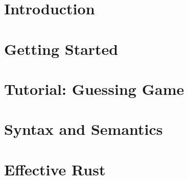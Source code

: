 \documentclass[fontsize=11pt,oneside]{scrbook}
\begin{document}
    \newcommand{\x}{\code{x}}
    \newcommand{\y}{\code{y}}
    \newcommand{\z}{\code{z}}
    \newcommand{\struct}{\code{struct}}
    \newcommand{\mut}{\code{mut}}
    \newcommand{\varchar}{\code{char}}
    \newcommand{\println}{\code{println!}}
    \newcommand{\panic}{\code{panic!}}
    \newcommand{\keylet}{\code{let}}
    \newcommand{\enum}{\code{enum}}
    \newcommand{\String}{\code{String}}
    \newcommand{\match}{\code{match}}
    \newcommand{\keyref}{\code{ref}}
    \newcommand{\itt}{\code{i32}}
    \newcommand{\keyif}{\code{if}}
    \newcommand{\result}{\code{Result}}
    \newcommand{\option}{\code{Option}}
    \newcommand{\none}{\code{None}}
    
    \clearscrheadfoot
    \ohead{\rightmark}
    \pagestyle{scrheadings}
    
    
    \pagebreak
    
    \tableofcontents
    \pagebreak

    \blankpage
    \chapter{Introduction}
    \label{sec:intro}
    
    
    \blankpage
    \chapter{Getting Started}
    \label{sec:gettingstarted}
    
    
    \blankpage
    \chapter{Tutorial: Guessing Game}
    \label{sec:tutorial}
    
    
    \blankpage
    \chapter{Syntax and Semantics}
    \label{sec:syntax}
    
    
    \blankpage
    \chapter{Effective Rust}
    \label{sec:effective_rust}
    
    
\end{document}
